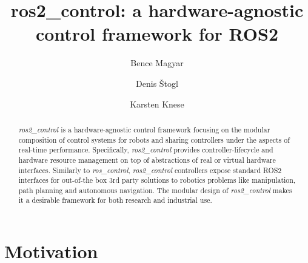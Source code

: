 \documentclass[journal]{IEEEtran}
\begin{document}
%
\title{ros2\_control: a hardware-agnostic control framework for ROS2}
%
%
\author{Bence Magyar \and
Denis Štogl \and
Karsten Knese}
%
\maketitle              %
%
\begin{abstract}
\emph{ros2\_control} is a hardware-agnostic control framework focusing on the modular composition of control systems for robots and sharing controllers under the aspects of real-time performance.
Specifically, \emph{ros2\_control} provides controller-lifecycle and hardware resource management on top of abstractions of real or virtual hardware interfaces.
Similarly to \emph{ros\_control}, \emph{ros2\_control} controllers expose standard ROS2 interfaces for out-of-the box 3rd
party solutions to robotics problems like manipulation, path planning and autonomous navigation.
The modular design of \emph{ros2\_control} makes it a desirable framework for both research and industrial use.


\end{abstract}
%
%
%
\section{Motivation}

\end{document}
